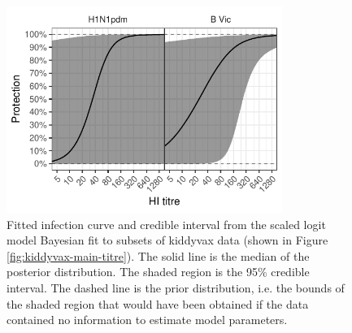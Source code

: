 \documentclass[12pt]{article}
\begin{document}
\begin{figure}[htp]
	\centering
	\includegraphics[width=0.8\textwidth]{../fit-sclr-bayesian-plot/kiddyvaxmain-prot.pdf}
	\caption{
Fitted infection curve and credible interval from the scaled logit model Bayesian fit to subsets of kiddyvax data (shown in Figure \ref{fig:kiddyvax-main-titre}). The solid line is the median of the posterior distribution. The shaded region is the 95\% credible interval. The dashed line is the prior distribution, i.e. the bounds of the shaded region that would have been obtained if the data contained no information to estimate model parameters.
	}
	\label{fig:kiddyvaxmain-prot-bayes-sclr}
\end{figure}
\end{document}
